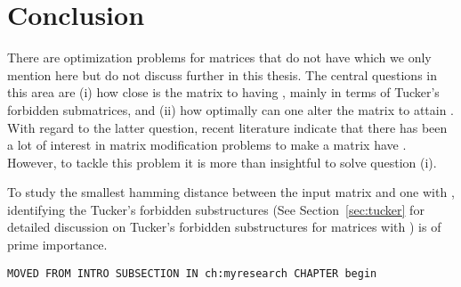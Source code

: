\xclearpage

\chapter{Conclusion}
\label{ch:conclusion}

%


There are optimization problems for matrices that do not have \COP
which we only mention here but do not discuss further in this
thesis. The central questions in this area are (i) how close is the
matrix to having \COP, mainly in terms of Tucker's forbidden
submatrices, and (ii) how optimally can one alter the matrix to attain
\COP.  With regard to the latter question, recent literature indicate
that there has been a lot of interest in matrix modification problems
to make a matrix have \COP \cite{hg02, tz07}. However, to tackle this
problem it is more than insightful to solve question (i). 

To study the smallest hamming distance  between the
input matrix and one with \COP, identifying the Tucker's forbidden
substructures (See Section~\ref{sec:tucker} for detailed
  discussion on Tucker's forbidden substructures for matrices with
  \COP) is of prime importance. 



\begin{center} {\tt MOVED FROM INTRO SUBSECTION IN ch:myresearch
    CHAPTER begin}
\end{center}

